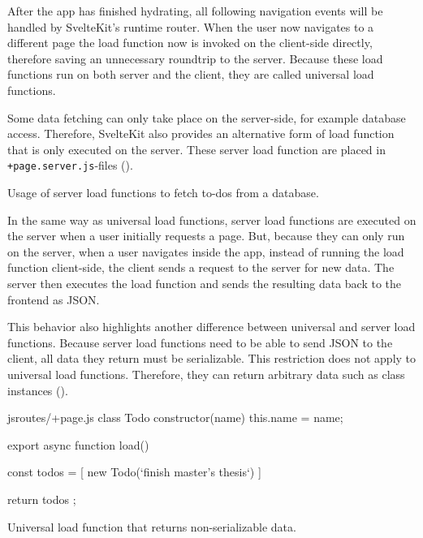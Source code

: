 After the app has finished hydrating, all following navigation events will be handled by SvelteKit's runtime router. When the user now navigates to a different page the load function now is invoked on the client-side directly, therefore saving an unnecessary roundtrip to the server. Because these load functions run on both server and the client, they are called universal load functions.

Some data fetching can only take place on the server-side, for example database access. Therefore, SvelteKit also provides an alternative form of load function that is only executed on the server. These server load function are placed in \texttt{+page.server.js}-files ().

\begin{listing}[h!]
\s{$}
\caption{Usage of server load functions to fetch to-dos from a database.}
\label{fig:sveltekit-server-load-function}
\end{listing}

In the same way as universal load functions, server load functions are executed on the server when a user initially requests a page. But, because they can only run on the server, when a user navigates inside the app, instead of running the load function client-side, the client sends a request to the server for new data. The server then executes the load function and sends the resulting data back to the frontend as JSON.

This behavior also highlights another difference between universal and server load functions. Because server load functions need to be able to send JSON to the client, all data they return must be serializable. This restriction does not apply to universal load functions. Therefore, they can return arbitrary data such as class instances ().

\begin{listing}[h!]
\begin{myminted}{js}{routes/+page.js}
class Todo {
  constructor(name) {
    this.name = name;
  }
}

export async function load() {
  const todos =  [ new Todo(`finish master's thesis`) ]

  return { todos };
}
\end{myminted}
\caption{Universal load function that returns non-serializable data.}
\label{fig:sveltekit-universal-load}
\end{listing}

